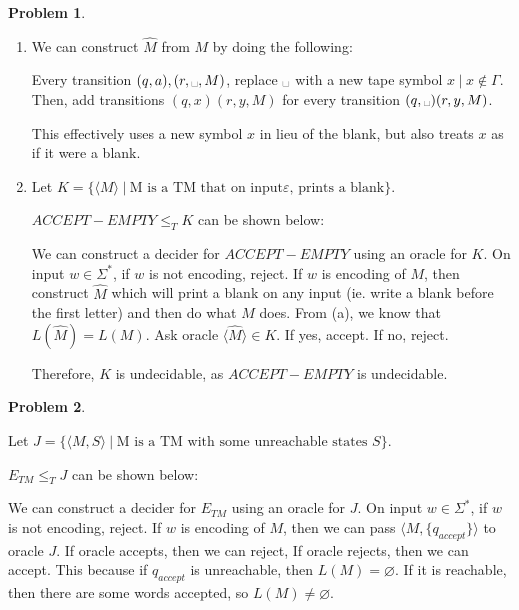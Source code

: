 \documentclass[11pt]{article}
\newcommand{\pipe}{\hspace{3pt}|\hspace{3pt}}
\theoremstyle{definition}
\theoremstyle{case}
\theoremstyle{theorem}
\newtheorem{prob}{Problem}
\begin{document}
\begin{prob}\end{prob}

\begin{enumerate}[label=(\alph*)]

\item

We can construct $\hat{M}$ from $M$ by doing the following:

Every transition $(q, a), (r, \text{\textvisiblespace}, M)$, replace $\text{\textvisiblespace}$ with
a new tape symbol $x \pipe x \notin \Gamma$. Then, add transitions $(q, x) (r, y, M)$ for 
every transition $(q, \text{\textvisiblespace}) (r, y, M)$. 

This effectively uses a new symbol $x$ in lieu of the blank, but also treats $x$ as
if it were a blank.

\item

Let $K = \{\langle M \rangle \pipe \text{M is a TM that on input} \varepsilon\text{, prints a blank}\}$. 

$ACCEPT-EMPTY \leq_{T} K$ can be shown below:

We can construct a decider for $ACCEPT-EMPTY$ using an oracle for $K$. On
input $w \in \Sigma^*$, if $w$ is not encoding, reject. If $w$ is encoding of $M$,
then construct $\hat{M}$ which will print a blank on any input (ie. write a blank before the 
first letter) and then do what $M$ does. From (a), we know that $L(\hat{M}) = L(M)$. 
Ask oracle $\langle \hat{M} \rangle \in K$. If yes, accept. If no, reject.

Therefore, $K$ is undecidable, as $ACCEPT-EMPTY$ is undecidable.

\end{enumerate}

\newpage

\begin{prob}\end{prob}

Let $J = \{ \langle M, S \rangle \pipe \text{M is a TM with some unreachable states } S \}$.

$E_{TM} \leq_{T} J$ can be shown below:

We can construct a decider for $E_{TM}$ using an oracle for $J$. On
input $w \in \Sigma^*$, if $w$ is not encoding, reject. If $w$ is encoding of $M$,
then we can pass $\langle M, \{ q_{accept} \} \rangle$ to oracle $J$. If oracle
accepts, then we can reject, If oracle rejects, then we can accept. This because
if $q_{accept}$ is unreachable, then $L(M) = \varnothing$. If it is reachable,
then there are some words accepted, so $L(M) \neq \varnothing$.
\end{document}

